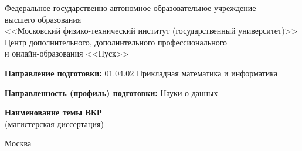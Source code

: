 \documentclass[a4paper, 12pt, oneside, openany]{article}
\begin{document}
\begin{titlepage} %
\begin{center} %
Федеральное государственно автономное образовательное учреждение\\ высшего образования\\
<<Московский физико-технический институт (государственный университет)>>\\
Центр дополнительного, дополнительного профессионального\\и онлайн-образования <<Пуск>>\\ [2cm]
\end{center} %
\par
\textbf{Направление подготовки:} 01.04.02 Прикладная математика и информатика

\textbf{Направленность (профиль) подготовки:} Науки о данных

\vspace{2cm}

\begin{center} %
{\huge\textbf{Наименование темы ВКР}}\\
(магистерская диссертация)\\[2cm]
\end{center} %
\vfill %
\begin{center}{Москва \the\year}\end{center} %
\thispagestyle{empty} %
\end{titlepage} %
\end{document}
